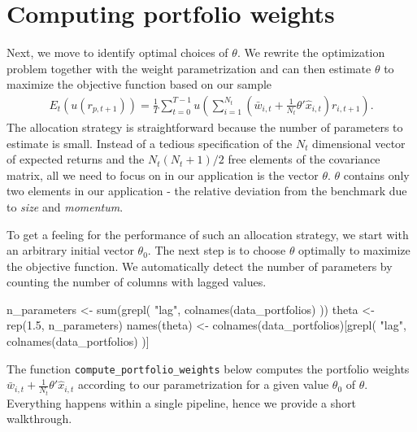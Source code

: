 \documentclass[
]{krantz}
\newenvironment{Shaded}{\begin{snugshade}}{\end{snugshade}}
\newcommand{\FloatTok}[1]{\textcolor[rgb]{0.06,0.06,0.06}{#1}}
\newcommand{\FunctionTok}[1]{\textcolor[rgb]{0,0,0}{#1}}
\newcommand{\NormalTok}[1]{#1}
\newcommand{\OtherTok}[1]{\textcolor[rgb]{0.37,0.37,0.37}{#1}}
\newcommand{\StringTok}[1]{\textcolor[rgb]{0.5,0.5,0.5}{#1}}
\begin{document}
\hypertarget{computing-portfolio-weights}{%
\section{Computing portfolio weights}\label{computing-portfolio-weights}}

Next, we move to identify optimal choices of \(\theta\). We rewrite the optimization problem together with the weight parametrization and can then estimate \(\theta\) to maximize the objective function based on our sample
\[\begin{aligned}
E_t\left(u(r_{p, t+1})\right) = \frac{1}{T}\sum\limits_{t=0}^{T-1}u\left(\sum\limits_{i=1}^{N_t}\left(\bar{w}_{i,t} + \frac{1}{N_t}\theta'\hat{x}_{i,t}\right)r_{i,t+1}\right).
\end{aligned}\]
The allocation strategy is straightforward because the number of parameters to estimate is small. Instead of a tedious specification of the \(N_t\) dimensional vector of expected returns and the \(N_t(N_t+1)/2\) free elements of the covariance matrix, all we need to focus on in our application is the vector \(\theta\). \(\theta\) contains only two elements in our application - the relative deviation from the benchmark due to \emph{size} and \emph{momentum}.

To get a feeling for the performance of such an allocation strategy, we start with an arbitrary initial vector \(\theta_0\). The next step is to choose \(\theta\) optimally to maximize the objective function. We automatically detect the number of parameters by counting the number of columns with lagged values.

\begin{Shaded}
\begin{Highlighting}[]
\NormalTok{n\_parameters }\OtherTok{\textless{}{-}} \FunctionTok{sum}\NormalTok{(}\FunctionTok{grepl}\NormalTok{(}
  \StringTok{"lag"}\NormalTok{,}
  \FunctionTok{colnames}\NormalTok{(data\_portfolios)}
\NormalTok{))}
\NormalTok{theta }\OtherTok{\textless{}{-}} \FunctionTok{rep}\NormalTok{(}\FloatTok{1.5}\NormalTok{, n\_parameters)}
\FunctionTok{names}\NormalTok{(theta) }\OtherTok{\textless{}{-}} \FunctionTok{colnames}\NormalTok{(data\_portfolios)[}\FunctionTok{grepl}\NormalTok{(}
  \StringTok{"lag"}\NormalTok{,}
  \FunctionTok{colnames}\NormalTok{(data\_portfolios)}
\NormalTok{)]}
\end{Highlighting}
\end{Shaded}

The function \texttt{compute\_portfolio\_weights} below computes the portfolio weights \(\bar{w}_{i,t} + \frac{1}{N_t}\theta'\hat{x}_{i,t}\) according to our parametrization for a given value \(\theta_0\) of \(\theta\). Everything happens within a single pipeline, hence we provide a short walkthrough.
\end{document}
